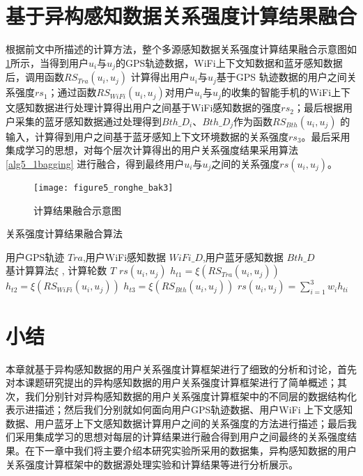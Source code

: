 \section{基于异构感知数据关系强度计算结果融合}
根据前文中所描述的计算方法，整个多源感知数据关系强度计算结果融合示意图如\ref{fig:ronghe}所示，当得到用户$u_{i}$与$u_{j}$的GPS轨迹数据，WiFi上下文知数据和蓝牙感知数据后，调用函数$RS_{Tra}(u_{i},u_{j})$ 计算得出用户$u_{i}$与$u_{j}$基于GPS 轨迹数据的用户之间关系强度$rs_{1}$；通过函数$RS_{WiFi}(u_{i},u_{j})$对用户$u_{i}$与$u_{j}$的收集的智能手机的WiFi上下文感知数据进行处理计算得出用户之间基于WiFi感知数据的强度$rs_{2}$；最后根据用户采集的蓝牙感知数据通过处理得到$Bth\_D_{i}$、$Bth\_D_{j}$作为函数$RS_{Bth}(u_{i},u_{j})$ 的输入，计算得到用户之间基于蓝牙感知上下文环境数据的关系强度$rs_{3}$。最后采用集成学习的思想，对每个层次计算得出的用户关系强度结果采用算法\ref{alg5_1bagging} 进行融合，得到最终用户$u_{i}$与$u_{j}$之间的关系强度$rs(u_{i},u_{j})$。
\begin{figure}[htb]
\centering
\texttt{[image: figure5\_ronghe\_bak3]}
\caption{计算结果融合示意图}
\label{fig:ronghe}
\end{figure}

\begin{algorithm}[htb]
\wuhao
\caption{关系强度计算结果融合算法}
\label{alg5_1bagging}
\begin{algorithmic}[1] %
				\REQUIRE 用户GPS轨迹 $Tra$,用户WiFi感知数据 $WiFi\_D$,用户蓝牙感知数据 $Bth\_D$ \\ 基计算算法$\xi$ , 计算轮数 $T$
				\ENSURE $rs(u_{i},u_{j})$
				\STATE $h_{t1}=\xi (RS_{Tra}(u_{i},u_{j}))$
                \STATE $h_{t2}=\xi (RS_{WiFi}(u_{i},u_{j}))$
                \STATE $h_{t3}=\xi (RS_{Bth}(u_{i},u_{j}))$
				\ENDWHILE
				\STATE $rs(u_{i},u_{j})=\sum_{i=1}^{3}w_{i}h_{ti}$
\end{algorithmic}
\end{algorithm}

\newpage
\section{小结}
\label{sec:section4-4}
本章就基于异构感知数据的用户关系强度计算框架进行了细致的分析和讨论，首先对本课题研究提出的异构感知数据的用户关系强度计算框架进行了简单概述；其次，我们分别针对异构感知数据的用户关系强度计算框架中的不同层的数据结构化表示进描述；然后我们分别就如何面向用户GPS轨迹数据、用户WiFi 上下文感知数据、用户蓝牙上下文感知数据计算用户之间的关系强度的方法进行描述；最后我们采用集成学习的思想对每层的计算结果进行融合得到用户之间最终的关系强度结果。在下一章中我们将主要介绍本研究实验所采用的数据集，异构感知数据的用户关系强度计算框架中的数据源处理实验和计算结果等进行分析展示。

